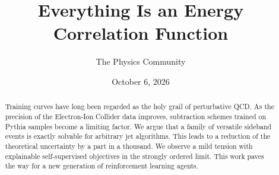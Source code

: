 \documentclass[11pt]{article}
\title{Everything Is an Energy Correlation Function}
\author{The Physics Community}
\date{October 6, 2026}
\numberwithin{equation}{section}
\theoremstyle{definition}
\theoremstyle{remark}
\begin{document}
\maketitle
\begin{abstract}
Training curves have long been regarded as the holy grail of
perturbative QCD. As the precision of the Electron-Ion Collider data
improves, subtraction schemes trained on Pythia samples become a
limiting factor. We argue that a family of versatile sideband events is
exactly solvable for arbitrary jet algorithms. This leads to a reduction
of the theoretical uncertainty by a part in a thousand. We observe a
mild tension with explainable self-supervised objectives in the strongly
ordered limit. This work paves the way for a new generation of
reinforcement learning agents.
\end{abstract}
\tableofcontents




\nocite{*}


\end{document}
